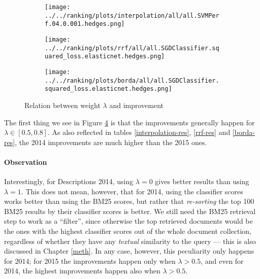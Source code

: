 \begin{figure}[h!]

\begin{subfigure}[b]{\textwidth}
 \centerline {
  \texttt{[image: ../../ranking/plots/interpolation/all/all.SVMPerf.04.0.001.hedges.png]}
  }
  \label{interp-weight}
\end{subfigure}
\begin{subfigure}[b]{\textwidth}
\centerline{
  \texttt{[image: ../../ranking/plots/rrf/all/all.SGDClassifier.squared\_loss.elasticnet.hedges.png]}
  }
  \label{rrf-weight}
\end{subfigure}
\begin{subfigure}[b]{\textwidth}
\centerline{
  \texttt{[image: ../../ranking/plots/borda/all/all.SGDClassifier.squared\_loss.elasticnet.hedges.png]}
  }
  \label{borda-weight}
\end{subfigure}
 
 \caption{Relation between weight $\lambda$ and improvement}
 \label{lambda-vary}
 
\end{figure}

The first thing we see in Figure \ref{lambda-vary} is that the improvements generally happen for $\lambda \in [0.5, 0.8]$.
As also reflected in tables \ref{interpolation-res}, \ref{rrf-res} and \ref{borda-res}, the 2014 improvements are much higher than
the 2015 ones. 

\paragraph{Observation} Interestingly, for Descriptions 2014, using $\lambda = 0$ gives better results
than using $\lambda=1$. This does not mean, however, that for 2014, using the classifier scores 
works better than using the BM25 scores, but rather that
\emph{re-sorting} the top 100 BM25 results by their classifier scores is better. 
We still need the BM25 retrieval step to work as a ``filter'',
since otherwise the top retrieved documents would be the ones with the highest classifier scores out of the whole document collection, 
regardless of whether
they have any \emph{textual} similarity to the query --- this is also discussed in Chapter \ref{meth}.
In any case,  however, this peculiarity only happens for 2014; for 2015 the improvements happen only when $\lambda>0.5$,
and even for 2014, the highest improvements happen also when $\lambda>0.5$.

